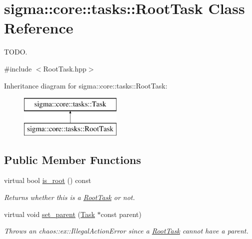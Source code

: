 \hypertarget{classsigma_1_1core_1_1tasks_1_1_root_task}{\section{sigma\-:\-:core\-:\-:tasks\-:\-:Root\-Task Class Reference}
\label{classsigma_1_1core_1_1tasks_1_1_root_task}
}


T\-O\-D\-O.  




{\ttfamily \#include $<$Root\-Task.\-hpp$>$}

Inheritance diagram for sigma\-:\-:core\-:\-:tasks\-:\-:Root\-Task\-:\begin{figure}[H]
\begin{center}
\leavevmode
\includegraphics[height=2.000000cm]{classsigma_1_1core_1_1tasks_1_1_root_task}
\end{center}
\end{figure}
\subsection*{Public Member Functions}
\begin{DoxyCompactItemize}
\item 
\hypertarget{classsigma_1_1core_1_1tasks_1_1_root_task_a121303d6c4380323fe54bc823ef11514}{virtual bool \hyperlink{classsigma_1_1core_1_1tasks_1_1_root_task_a121303d6c4380323fe54bc823ef11514}{is\-\_\-root} () const }\label{classsigma_1_1core_1_1tasks_1_1_root_task_a121303d6c4380323fe54bc823ef11514}

\begin{DoxyCompactList}\small\item\em Returns whether this is a \hyperlink{classsigma_1_1core_1_1tasks_1_1_root_task}{Root\-Task} or not. \end{DoxyCompactList}\item 
\hypertarget{classsigma_1_1core_1_1tasks_1_1_root_task_a4b9f9c86ba7a0e5b681479a444cd60b1}{virtual void \hyperlink{classsigma_1_1core_1_1tasks_1_1_root_task_a4b9f9c86ba7a0e5b681479a444cd60b1}{set\-\_\-parent} (\hyperlink{classsigma_1_1core_1_1tasks_1_1_task}{Task} $\ast$const parent)}\label{classsigma_1_1core_1_1tasks_1_1_root_task_a4b9f9c86ba7a0e5b681479a444cd60b1}

\begin{DoxyCompactList}\small\item\em Throws an chaos\-::ex\-::\-Illegal\-Action\-Error since a \hyperlink{classsigma_1_1core_1_1tasks_1_1_root_task}{Root\-Task} cannot have a parent. \end{DoxyCompactList}\end{DoxyCompactItemize}
